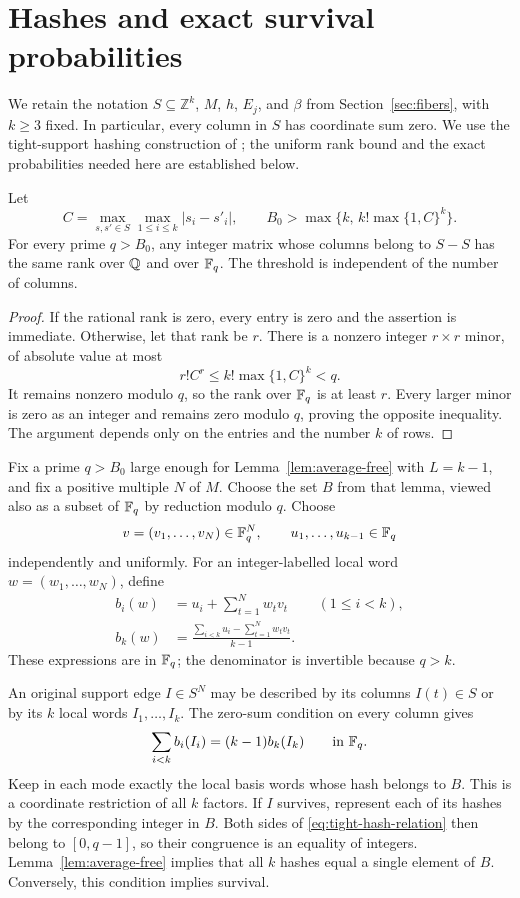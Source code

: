 \section{Hashes and exact survival probabilities}
\label{sec:hashing}

We retain the notation $S\subseteq\mathbb Z^k$, $M$, $h$, $E_j$,
and $\beta$ from Section~\ref{sec:fibers}, with $k\geq 3$ fixed. In
particular, every column in $S$ has coordinate sum zero. We use the
tight-support hashing construction of \cite{CVZ2019}; the uniform rank
bound and the exact probabilities needed here are established below.

\begin{lemma}
\label{lem:rank-reduction}
Let
\[
 C=\max_{s,s'\in S}\max_{1\leq i\leq k}|s_i-s'_i|,
 \qquad
 B_0>\max\{k,\,k!\max\{1,C\}^{k}\}.
\]
For every prime $q>B_0$, any integer matrix whose columns belong to
$S-S$ has the same rank over $\mathbb Q$ and over $\mathbb F_q$. The threshold is
independent of the number of columns.
\end{lemma}

\begin{proof}
If the rational rank is zero, every entry is zero and the assertion
is immediate. Otherwise, let that rank be $r$. There is a nonzero
integer $r\times r$ minor, of absolute value at most
\[
 r!C^r\leq k!\max\{1,C\}^{k}<q.
\]
It remains nonzero modulo $q$, so the rank over $\mathbb F_q$ is at least
$r$. Every larger minor is zero as an integer and remains zero
modulo $q$, proving the opposite inequality. The argument depends
only on the entries and the number $k$ of rows.
\end{proof}

Fix a prime $q>B_0$ large enough for Lemma~\ref{lem:average-free}
with $L=k-1$, and fix a positive multiple $N$ of $M$. Choose the set
$B$ from that lemma, viewed also as a subset of $\mathbb F_q$ by reduction
modulo $q$. Choose
\[
 v=(v_1,\ldots,v_N)\in\mathbb F_q^N,
 \qquad u_1,\ldots,u_{k-1}\in\mathbb F_q
\]
independently and uniformly. For an integer-labelled local word
$w=(w_1,\ldots,w_N)$, define
\begin{align*}
 b_i(w)&=u_i+\sum_{t=1}^Nw_t v_t &&(1\leq i<k),\\
 b_k(w)&=\frac{\sum_{i<k}u_i-\sum_{t=1}^Nw_t v_t}{k-1}.
\end{align*}
These expressions are in $\mathbb F_q$; the denominator is invertible
because $q>k$.

An original support edge $I\in S^N$ may be described by its columns
$I(t)\in S$ or by its $k$ local words $I_1,\ldots,I_k$. The
zero-sum condition on every column gives
\begin{equation}
 \sum_{i<k}b_i(I_i)=(k-1)b_k(I_k)\qquad\text{in }\mathbb F_q.
 \label{eq:tight-hash-relation}
\end{equation}
Keep in each mode exactly the local basis words whose hash belongs
to $B$. This is a coordinate restriction of all $k$ factors. If
$I$ survives, represent each of its hashes by the corresponding
integer in $B$. Both sides of \eqref{eq:tight-hash-relation} then
belong to $[0,q-1]$, so their congruence is an equality of integers.
Lemma~\ref{lem:average-free} implies that all $k$ hashes equal a
single element of $B$. Conversely, this condition implies survival.

